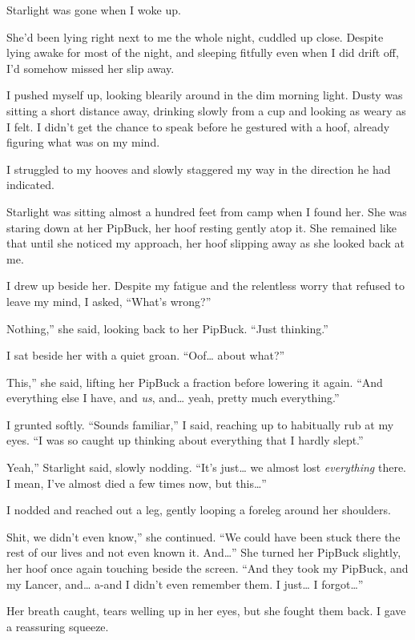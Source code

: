 Starlight was gone when I woke up.

She’d been lying right next to me the whole night, cuddled up close. Despite lying awake for most of the night, and sleeping fitfully even when I did drift off, I’d somehow missed her slip away.

I pushed myself up, looking blearily around in the dim morning light. Dusty was sitting a short distance away, drinking slowly from a cup and looking as weary as I felt. I didn’t get the chance to speak before he gestured with a hoof, already figuring what was on my mind.

I struggled to my hooves and slowly staggered my way in the direction he had indicated.

Starlight was sitting almost a hundred feet from camp when I found her. She was staring down at her PipBuck, her hoof resting gently atop it. She remained like that until she noticed my approach, her hoof slipping away as she looked back at me.

I drew up beside her. Despite my fatigue and the relentless worry that refused to leave my mind, I asked, “What’s wrong?”

\leavevmode{}Nothing,” she said, looking back to her PipBuck. “Just thinking.”

I sat beside her with a quiet groan. “Oof… about what?”

\leavevmode{}This,” she said, lifting her PipBuck a fraction before lowering it again. “And everything else I have, and \textit{us}, and… yeah, pretty much everything.”

I grunted softly. “Sounds familiar,” I said, reaching up to habitually rub at my eyes. “I was so caught up thinking about everything that I hardly slept.”

\leavevmode{}Yeah,” Starlight said, slowly nodding. “It’s just… we almost lost \textit{everything} there. I mean, I’ve almost died a few times now, but this…”

I nodded and reached out a leg, gently looping a foreleg around her shoulders.

\leavevmode{}Shit, we didn’t even know,” she continued. “We could have been stuck there the rest of our lives and not even known it. And…” She turned her PipBuck slightly, her hoof once again touching beside the screen. “And they took my PipBuck, and my Lancer, and… a-and I didn’t even remember them. I just… I forgot…”

Her breath caught, tears welling up in her eyes, but she fought them back. I gave a reassuring squeeze.

